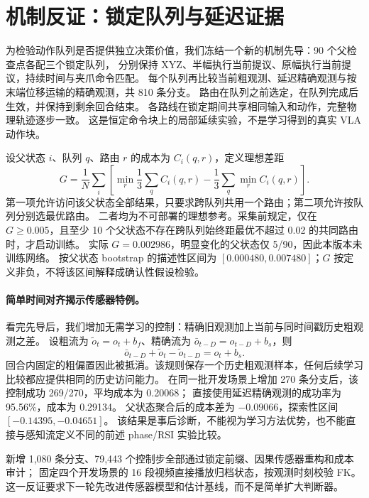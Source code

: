 \documentclass{article}
\begin{document}
\section{机制反证：锁定队列与延迟证据}
为检验动作队列是否提供独立决策价值，我们冻结一个新的机制先导：90 个父检查点各配三个锁定队列，
分别保持 XYZ、半幅执行当前提议、原幅执行当前提议，持续时间与夹爪命令匹配。
每个队列再比较当前粗观测、延迟精确观测与按末端位移运输的精确观测，共 810 条分支。
路由在队列之前选定，在队列完成后生效，并保持到剩余回合结束。
各路线在锁定期间共享相同输入和动作，完整物理轨迹逐步一致。
这是恒定命令块上的局部延续实验，不是学习得到的真实 VLA 动作块。

设父状态 $i$、队列 $q$、路由 $r$ 的成本为 $C_i(q,r)$，定义理想差距
\begin{equation}
G=\frac{1}{N}\sum_i\left[\min_r\frac{1}{3}\sum_q C_i(q,r)-\frac{1}{3}\sum_q\min_r C_i(q,r)\right].
\end{equation}
第一项允许访问该父状态全部结果，只要求跨队列共用一个路由；第二项允许按队列分别选最优路由。
二者均为不可部署的理想参考。采集前规定，仅在 $G\geq0.005$，且至少 10 个父状态不存在跨队列始终距最优不超过 0.02 的共同路由时，才启动训练。
实际 $G=0.002986$，明显变化的父状态仅 5/90，因此本版本未训练网络。
按父状态 bootstrap 的描述性区间为 $[0.000480,0.007480]$；$G$ 按定义非负，不将该区间解释成确认性假设检验。

\paragraph{简单时间对齐揭示传感器特例。}
看完先导后，我们增加无需学习的控制：精确旧观测加上当前与同时间戳历史粗观测之差。
设粗流为 $\tilde o_t=o_t+b_f$、精确流为 $\bar o_{t-D}=o_{t-D}+b_s$，则
\begin{equation}
\bar o_{t-D}+\tilde o_t-\tilde o_{t-D}=o_t+b_s.
\end{equation}
回合内固定的粗偏置因此被抵消。该规则保存一个历史粗观测样本，任何后续学习比较都应提供相同的历史访问能力。
在同一批开发场景上增加 270 条分支后，该控制成功 269/270，平均成本为 0.20068；
直接使用延迟精确观测的成功率为 95.56\%，成本为 0.29134。
父状态聚合后的成本差为 $-0.09066$，探索性区间 $[-0.14395,-0.04651]$。
该结果是事后诊断，不能视为学习方法优势，也不能直接与感知流定义不同的前述 phase/RSI 实验比较。

新增 1,080 条分支、79,443 个控制步全部通过锁定前缀、因果传感器重构和成本审计；
固定四个开发场景的 16 段视频直接播放归档状态，按观测时刻校验 FK。
这一反证要求下一轮先改进传感器模型和估计基线，而不是简单扩大判断器。
\end{document}
